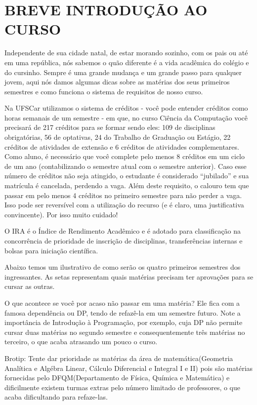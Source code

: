 \section{BREVE INTRODUÇÃO AO CURSO}
Independente de sua cidade natal, de estar morando sozinho, com os pais ou até em uma república, nós sabemos o quão diferente é a vida acadêmica do colégio e do cursinho. Sempre é uma grande mudança e um grande passo para qualquer jovem, aqui nós damos algumas dicas sobre as matérias dos seus primeiros semestres e como funciona o sistema de requisitos de nosso curso.

Na UFSCar utilizamos o sistema de créditos - você pode entender créditos como horas semanais de um semestre - em que, no curso Ciência da Computação você precisará de 217 créditos para se formar sendo eles: 109 de disciplinas obrigatórias, 56 de optativas, 24 do Trabalho de Graduação ou Estágio, 22 créditos de atividades de extensão e 6 créditos de atividades complementares. Como aluno, é necessário que você complete pelo menos 8 créditos em um ciclo de um ano (contabilizando o semestre atual com o semestre anterior). Caso esse número de créditos não seja atingido, o estudante é considerado “jubilado” e sua matrícula é cancelada, perdendo a vaga. Além deste requisito, o calouro tem que passar em pelo menos 4 créditos no primeiro semestre para não perder a vaga. Isso pode ser reversível com a utilização do recurso (e é claro, uma justificativa convincente). Por isso muito cuidado!

O IRA é o Índice de Rendimento Acadêmico e é adotado para classificação na concorrência de prioridade de inscrição de disciplinas, transferências internas e bolsas para iniciação científica.

Abaixo temos um ilustrativo de como serão os quatro primeiros semestres dos ingressantes. As setas representam quais matérias precisam ter aprovações para se cursar as outras.

O que acontece se você por acaso não passar em uma matéria? Ele fica com a
famosa dependência ou DP, tendo de refazê-la em um semestre futuro. Note a
importância de Introdução à Programação, por exemplo, cuja DP não permite
cursar duas matérias no segundo semestre e consequentemente três matérias no terceiro, o que acaba atrasando um pouco o curso.

Brotip: Tente dar prioridade as matérias da área de matemática(Geometria Analítica e Algébra Linear, Cálculo Diferencial e Integral I e II) pois são matérias fornecidas pelo DFQM(Departamento de Física, Química e Matemática)
e dificilmente existem turmas extras pelo número limitado de professores, o que acaba dificultando para refaze-las.

